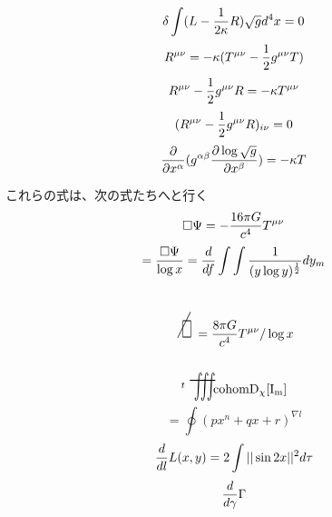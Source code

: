 \documentclass{jsarticle}
\begin{document}
 $$ \delta \int (L - {1 \over {2\kappa}}R)\sqrt{g} d^4 x = 0 $$
 $$ R^{\mu\nu} = - \kappa(T^{\mu\nu} - {1 \over 2}g^{\mu\nu}T) $$ 
 $$ R^{\mu\nu} - {1 \over 2}g^{\mu\nu}R = - \kappa T^{\mu\nu} $$
 $$ (R^{\mu\nu} - {1 \over 2}g^{\mu\nu}R)_{i\nu} = 0$$
 $$ {\partial \over {\partial x^{\alpha}}}(g^{\alpha \beta}{\partial
 \log \sqrt{g} \over {\partial x^{\beta}}}) = - \kappa T $$
 
  これらの式は、次の式たちへと行く
  $$ \square \Psi = - {16 \pi G \over c^4}T^{\mu\nu} $$
  $$ = {\square \Psi \over {\log x}} = {d \over df}\int \int
  {1 \over {(y \log y)^{1 \over 2}}}dy_m $$
  $$ \scalebox{1}[2]{\alearletter} = 
  {{{{8 \pi G} \over {c^4}}T^{\mu\nu}}/ \log x} $$
  $$ {}^{t}\scalebox{1}[2]{\variiint}\mathrm{cohom D_{\chi}[I_m]}$$
  $$ = \oint {(px^n + qx + r)^{\nabla l}} $$
  $$ {d \over d l}L(x,y) = 2 \int ||\sin 2x||^{2}d \tau $$
  $$ {d \over d \gamma}\Gamma $$
 
\end{document}
